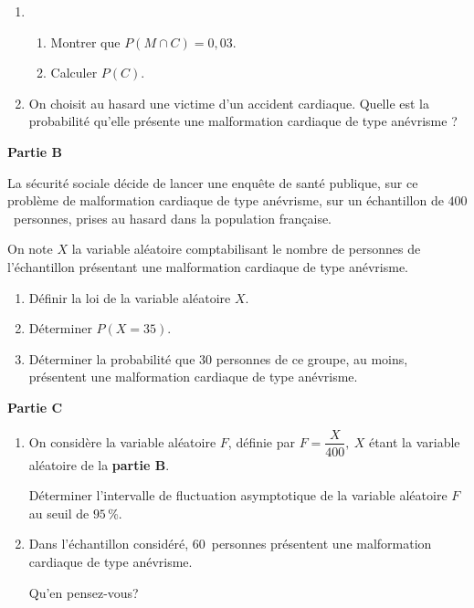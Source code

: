 \documentclass[10pt]{article}
\begin{document}
\medskip
 
\begin{enumerate}
\item 
	\begin{enumerate}
		\item Montrer que $P(M \cap C) = 0,03$. 
		\item Calculer $P(C)$.
	\end{enumerate} 
\item On choisit au hasard une victime d'un accident cardiaque. Quelle est la probabilité qu'elle présente une malformation cardiaque de type anévrisme ?
\end{enumerate}

\bigskip
 
\textbf{Partie B}

\medskip 

La sécurité sociale décide de lancer une enquête de santé publique, sur ce problème de malformation cardiaque de type anévrisme, sur un échantillon de $400$~personnes, prises au hasard dans la population française.
 
On note $X$ la variable aléatoire comptabilisant le nombre de personnes de l'échantillon présentant une malformation cardiaque de type anévrisme.

\medskip
 
\begin{enumerate}
\item Définir la loi de la variable aléatoire $X$. 
\item Déterminer $P(X = 35)$. 
\item Déterminer la probabilité que $30$ personnes de ce groupe, au moins, présentent une malformation cardiaque de type anévrisme.
\end{enumerate}
 
\bigskip
 
\textbf{Partie C}

\medskip
 
\begin{enumerate}
\item On considère la variable aléatoire $F$, définie par $F = \dfrac{X}{400},\:X$ étant la variable aléatoire de 
la \textbf{partie B}.
 
Déterminer l'intervalle de fluctuation asymptotique de la variable aléatoire $F$ au seuil de $95$\,\%. 
\item Dans l'échantillon considéré, $60$~personnes présentent une malformation cardiaque de type anévrisme.
 
Qu'en pensez-vous? 
\end{enumerate}
\newpage
\hypertarget{Caledoniemars}{}
\end{document}
